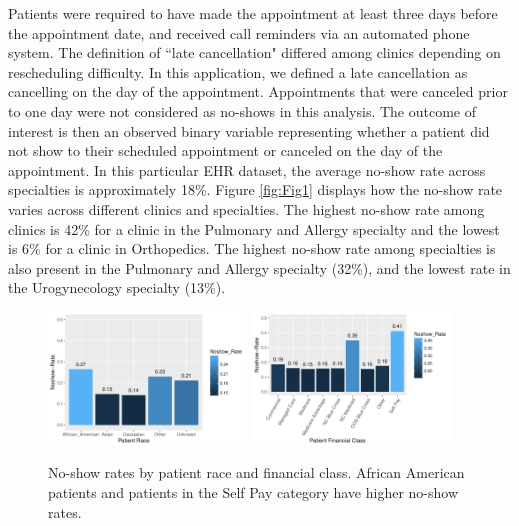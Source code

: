 \documentclass[twoside,11pt]{article}
\begin{document}
Patients were required to have made the appointment at least three days before the appointment date, and received call reminders via an automated phone system. The definition of ``late cancellation" differed among clinics depending on rescheduling difficulty. In this application, we defined a late cancellation as cancelling on the day of the appointment. Appointments that were canceled prior to one day were not considered as no-shows in this analysis. The outcome of interest is then an observed binary variable representing whether a patient did not show to their scheduled appointment or canceled on the day of the appointment. In this particular EHR dataset, the average no-show rate across specialties is approximately 18\%. Figure \ref{fig:Fig1} displays how the no-show rate varies across different clinics and specialties. The highest no-show rate among clinics is 42\% for a clinic in the Pulmonary and Allergy specialty and the lowest is 6\% for a clinic in Orthopedics. The highest no-show rate among specialties is also present in the Pulmonary and Allergy specialty (32\%), and the lowest rate in the Urogynecology specialty (13\%). 

\begin{figure}[h]
\begin{center}
\includegraphics[width=0.47\textwidth]{fig2/eda-ns-fta}
\includegraphics[width=0.47\textwidth]{fig2/eda-ns-ftb}
\caption{No-show rates by patient race and financial class. African American patients and patients in the Self Pay category have higher no-show rates.}\label{fig:Fig2}
\end{center}
\vspace{-0.5cm}
\end{figure}
\end{document}
